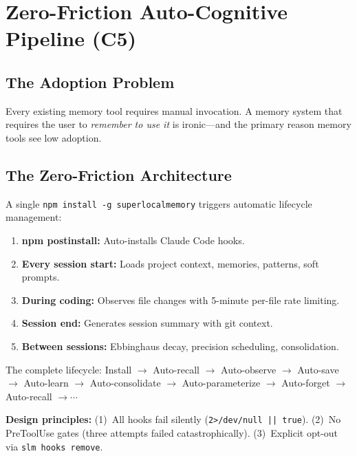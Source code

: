 \section{Zero-Friction Auto-Cognitive Pipeline (C5)}
\label{sec:pipeline}

\subsection{The Adoption Problem}

Every existing memory tool requires manual invocation. A memory system that requires the user to \emph{remember to use it} is ironic---and the primary reason memory tools see low adoption.

\subsection{The Zero-Friction Architecture}

A single \texttt{npm install -g superlocalmemory} triggers automatic lifecycle management:
\begin{enumerate}[topsep=2pt, itemsep=1pt]
  \item \textbf{npm postinstall:} Auto-installs Claude Code hooks.
  \item \textbf{Every session start:} Loads project context, memories, patterns, soft prompts.
  \item \textbf{During coding:} Observes file changes with 5-minute per-file rate limiting.
  \item \textbf{Session end:} Generates session summary with git context.
  \item \textbf{Between sessions:} Ebbinghaus decay, precision scheduling, consolidation.
\end{enumerate}

The complete lifecycle: Install $\to$ Auto-recall $\to$ Auto-observe $\to$ Auto-save $\to$ Auto-learn $\to$ Auto-consolidate $\to$ Auto-parameterize $\to$ Auto-forget $\to$ Auto-recall $\to \cdots$

\textbf{Design principles:} (1)~All hooks fail silently (\texttt{2>/dev/null || true}). (2)~No PreToolUse gates (three attempts failed catastrophically). (3)~Explicit opt-out via \texttt{slm hooks remove}.

